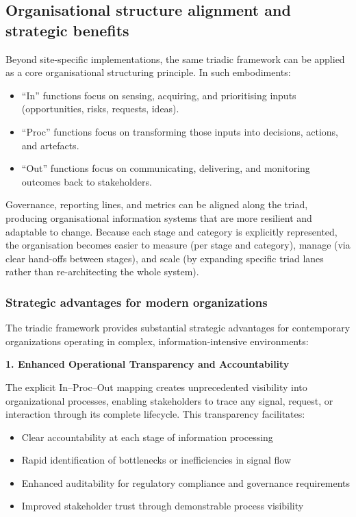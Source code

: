 \documentclass[11pt,a4paper]{article}
\begin{document}
\subsection*{Organisational structure alignment and strategic benefits}

Beyond site-specific implementations, the same triadic framework can be applied as a core organisational structuring principle. In such embodiments:
\begin{itemize}[noitemsep]
  \item ``In'' functions focus on sensing, acquiring, and prioritising inputs (opportunities, risks, requests, ideas).
  \item ``Proc'' functions focus on transforming those inputs into decisions, actions, and artefacts.
  \item ``Out'' functions focus on communicating, delivering, and monitoring outcomes back to stakeholders.
\end{itemize}

Governance, reporting lines, and metrics can be aligned along the triad, producing organisational information systems that are more resilient and adaptable to change. Because each stage and category is explicitly represented, the organisation becomes easier to measure (per stage and category), manage (via clear hand-offs between stages), and scale (by expanding specific triad lanes rather than re-architecting the whole system).

\subsubsection*{Strategic advantages for modern organizations}

The triadic framework provides substantial strategic advantages for contemporary organizations operating in complex, information-intensive environments:

\textbf{1. Enhanced Operational Transparency and Accountability}

The explicit In--Proc--Out mapping creates unprecedented visibility into organizational processes, enabling stakeholders to trace any signal, request, or interaction through its complete lifecycle. This transparency facilitates:
\begin{itemize}[noitemsep]
  \item Clear accountability at each stage of information processing
  \item Rapid identification of bottlenecks or inefficiencies in signal flow
  \item Enhanced auditability for regulatory compliance and governance requirements
  \item Improved stakeholder trust through demonstrable process visibility
\end{itemize}
\end{document}
